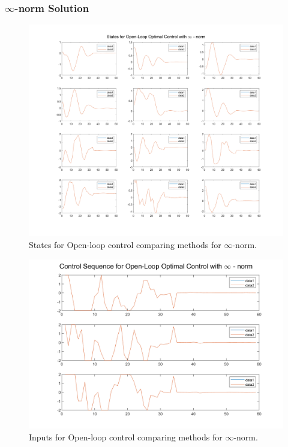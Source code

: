 \documentclass[letter]{article}
\begin{document}
\subsubsection{$\infty$-norm Solution}
\begin{figure}[h]
	\centering
	\includegraphics[width=1\linewidth]{fig/pblm1_inftyn_x}
	\caption{States for Open-loop control comparing methods for $\infty$-norm.}
	\label{fig:pblm1inftynx}
\end{figure}\newpage

\begin{figure}[h]
	\centering
	\includegraphics[width=1\linewidth]{fig/pblm1_inftyn_u}
	\caption{Inputs for Open-loop control comparing methods for $\infty$-norm.}
	\label{fig:pblm1inftynu}
\end{figure}\newpage
\end{document}

